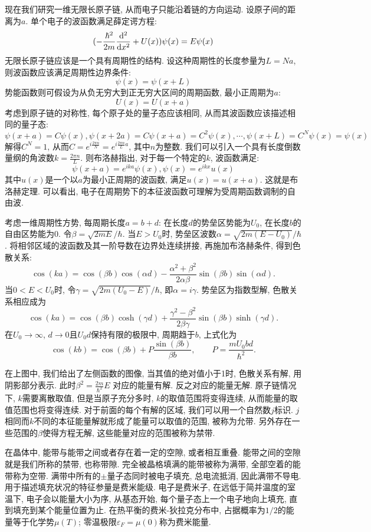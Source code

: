 现在我们研究一维无限长原子链, 从而电子只能沿着链的方向运动. 设原子间的距离为$a$. 单个电子的波函数满足薛定谔方程:
\[
(-\frac{\hbar^2}{2m}\frac{\mathop{}\!\mathrm{d} ^2}{\mathop{}\!\mathrm{d} x^2}+U(x))\psi(x) = E\psi(x)
\]
无限长原子链应该是一个具有周期性的结构. 设这种周期性的长度参量为$L=N a$, 则波函数应该满足周期性边界条件:
\[
\psi(x) = \psi(x+L)
\]
势能函数则可假设为从负无穷大到正无穷大区间的周期函数, 最小正周期为$a$:
\[
U(x) =U(x+a)
\]
考虑到原子链的对称性, 每个原子处的量子态应该相同, 从而其波函数应该描述相同的量子态:
\[
\psi(x+a) = C\psi(x) , \psi(x+2a) = C\psi(x+a) = C^2\psi(x) ,\cdots, \psi(x+L) = C^N\psi(x) = \psi(x)
\]
解得$C^N = 1$, 从而$C = e^{i\frac{2\pi n }{N}} = e^{i\frac{2\pi n}{L}a}$, 其中$n$为整数. 我们可以引入一个具有长度倒数量纲的角波数$k=\frac{2\pi n}{L}$. 则布洛赫指出, 对于每一个特定的$k$, 波函数满足:
\[
\psi(x+a) = e^{ika} \psi(x),  \psi(x) = e^{ikx}u(x)
\]
其中$u(x)$是一个以$a$为最小正周期的波函数, 满足$u(x) = u(x+a)$. 这就是布洛赫定理. 可以看出, 电子在周期势下的本征波函数可理解为受周期函数调制的自由波.

考虑一维周期性方势, 每周期长度$a=b+d$: 在长度$d$的势垒区势能为$U_0$, 在长度$b$的自由区势能为$0$. 令$\beta=\sqrt{2mE}/\hbar$. 当$E>U_0$时, 势垒区波数$\alpha=\sqrt{2m(E-U_0)}/\hbar$. 将相邻区域的波函数及其一阶导数在边界处连续拼接, 再施加布洛赫条件, 得到色散关系:
\[
\cos(ka)=\cos(\beta b)\cos(\alpha d)
-\frac{\alpha^2+\beta^2}{2\alpha\beta}
\sin(\beta b)\sin(\alpha d).
\]
当$0<E<U_0$时, 令$\gamma=\sqrt{2m(U_0-E)}/\hbar$, 即$\alpha=i\gamma$. 势垒区为指数型解, 色散关系相应成为
\[
\cos(ka)=\cos(\beta b)\cosh(\gamma d)
+\frac{\gamma^2-\beta^2}{2\beta\gamma}
\sin(\beta b)\sinh(\gamma d).
\]
在$U_0\to\infty$, $d\to0$且$U_0d$保持有限的极限中, 周期趋于$b$, 上式化为
\[
\cos(kb)=\cos(\beta b)+P\frac{\sin(\beta b)}{\beta b},
\qquad P=\frac{mU_0bd}{\hbar^2}.
\]

在上图中, 我们给出了左侧函数的图像, 当其值的绝对值小于1时, 色散关系有解, 用阴影部分表示. 此时$\beta^2 = \frac{2m}{\hbar^2}E$ 对应的能量有解. 反之对应的能量无解. 原子链情况下, $k$需要离散取值, 但是当原子充分多时, $k$的取值范围将变得连续, 从而能量的取值范围也将变得连续. 对于前面的每个有解的区域, 我们可以用一个自然数$j$标识. $j$相同而$k$不同的本征能量解就形成了能量可以取值的范围, 被称为允带. 另外存在一些范围的$\beta$使得方程无解, 这些能量对应的范围被称为禁带.




在晶体中, 能带与能带之间或者存在着一定的空隙, 或者相互重叠. 能带之间的空隙就是我们所称的禁带, 也称带隙. 完全被晶格填满的能带被称为满带, 全部空着的能带称为空带. 满带中所有的$\pm$量子态同时被电子填充, 总电流抵消, 因此满带不导电. 用于描述填充状况的特征参量是费米能级. 电子是费米子, 在远低于简并温度的室温下, 电子会以能量大小为序, 从基态开始, 每个量子态上一个电子地向上填充, 直到填充到某个能量位置为止. 在热平衡的费米-狄拉克分布中, 占据概率为$1/2$的能量等于化学势$\mu(T)$; 零温极限$\varepsilon_F=\mu(0)$称为费米能量.


